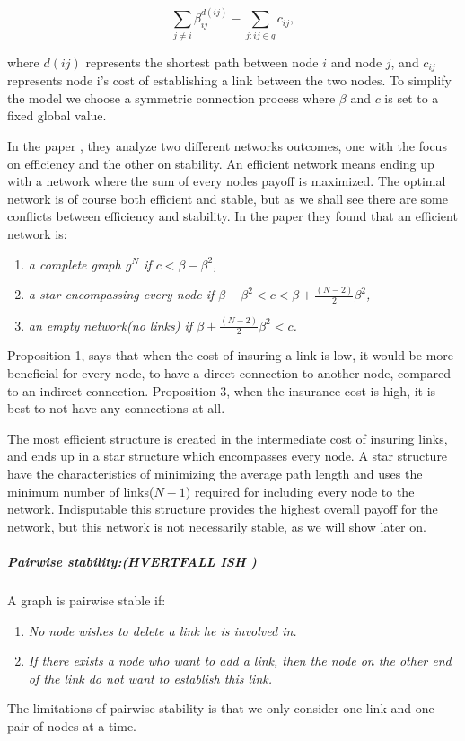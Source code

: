 \begin{equation}
\sum_{j\neq i}^{} \beta_{ij}^{d(ij)} - \sum_{j:ij\in g}^{} {c}_{ij}, 
\label{connecetionGame}
\end{equation}

where $d(ij)$ represents the shortest path between node $i $ and node $j $, and ${c}_{ij}$ represents node i's cost of establishing a link between the two nodes. To simplify the model we choose a symmetric connection process where $\beta$ and $c$ is set to a fixed global value. 

In the paper \cite{jackson1996strategic}, they analyze two different networks outcomes, one with the focus on efficiency and the other on stability. An efficient network means ending up with a network where the sum of every nodes payoff is maximized. The optimal network is of course both efficient and stable, but as we shall see there are some conflicts between efficiency and stability. In the paper they found that an efficient network is:
\begin{enumerate}
\item \textit{a complete graph $g^N$ if $c<\beta - \beta^2$,}
\item \textit{a star encompassing every node if $\beta - \beta^2 < c < \beta + \frac{(N-2)}{2}\beta^2$,}
\item \textit{an empty network(no links) if $\beta + \frac{(N-2)}{2}\beta^2 < c$.}
\end{enumerate}

Proposition 1, says that when the cost of insuring a link is low, it would be more beneficial for every node, to have a direct connection to another node, compared to an indirect connection.
Proposition 3, when the insurance cost is high, it is best to not have any connections at all.

The most efficient structure is created in the intermediate cost of insuring links, and ends up in a star structure which encompasses every node. A star structure have the characteristics of minimizing the average path length and uses the minimum number of links($N-1$) required for including every node to the network. 
Indisputable this structure provides the highest overall payoff for the network, but this network is not necessarily stable, as we will show later on.

\subparagraph{Pairwise stability:(HVERTFALL ISH )}
A graph is pairwise stable if:
 \begin{enumerate}
\item \textit{No node wishes to delete a link he is involved in.}
\item \textit{If there exists a node who want to add a link, then the node on the other end of the link do not want to establish this link.}
\end{enumerate} 
The limitations of pairwise stability is that we only consider one link and one pair of nodes at a time.

